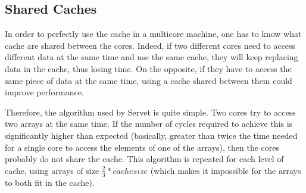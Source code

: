 \subsection{Shared Caches}
In order to perfectly use the cache in a multicore machine, one has to know what
cache are shared between the cores. Indeed, if two different cores need to
access different data at the same time and use the same cache, they will keep
replacing data in the cache, thus losing time. On the opposite, if they have to
access the same piece of data at the same time, using a cache shared between
them could improve performance.

Therefore, the algorithm used by Servet is quite simple. Two cores try to
access two arrays at the same time. If the number of cycles required to achieve
this is significantly higher than expected (basically, greater than twice the
time needed for a single core to access the elements of one of the arrays), then
the cores probably do not share the cache. This algorithm is repeated for each
level of cache, using arrays of size $\frac{2}{3} * cache size$ (which makes it
impossible for the arrays to both fit in the cache).
